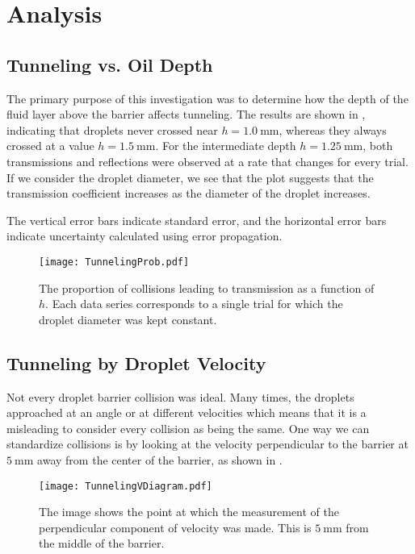\renewcommand{\thefootnote}{\arabic{footnote}}
\section{Analysis}


    \subsection{Tunneling vs. Oil Depth}
The primary purpose of this investigation was to determine how the depth of the fluid layer above the barrier affects tunneling. The results are shown in , indicating that droplets never crossed near $h=1.0~\mathrm{mm}$, whereas they always crossed at a value $h=1.5~\mathrm{mm}$. For the intermediate depth $h=1.25~\mathrm{mm}$, both transmissions and reflections were observed at a rate that changes for every trial. If we consider the droplet diameter, we see that the plot suggests that the transmission coefficient increases as the diameter of the droplet increases. 

The vertical error bars indicate standard error, and the horizontal error bars indicate uncertainty calculated using error propagation. 

\begin{figure}[h!]
	\centering
	\texttt{[image: TunnelingProb.pdf]}
	\caption{The proportion of collisions leading to transmission as a function of $h$. Each data series corresponds to a single trial for which the droplet diameter was kept constant.}
	\label{tbh}
\end{figure}


    \subsection{Tunneling by Droplet Velocity}
Not every droplet barrier collision was ideal. Many times, the droplets approached at an angle or at different velocities which means that it is a misleading to consider every collision as being the same. One way we can standardize collisions is by looking at the velocity perpendicular to the barrier at $5~\mathrm{mm}$ away from the center of the barrier, as shown in .

\begin{figure}[h!]
	\centering
	\texttt{[image: TunnelingVDiagram.pdf]}
	\caption{The image shows the point at which the measurement of the perpendicular component of velocity was made. This is $5~\mathrm{mm}$ from the middle of the barrier.}
	\label{tvd}
\end{figure}

